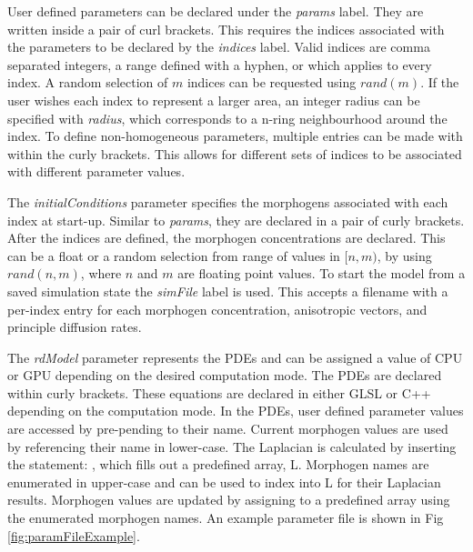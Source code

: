 User defined parameters can be declared under the \textit{params} label. They are written inside a pair of curl brackets. This requires the indices associated with the parameters to be declared by the \textit{indices} label. Valid indices are comma separated integers, a range defined with a hyphen, or  which applies to every index. A random selection of $m$ indices can be requested using $rand(m)$. If the user wishes each index to represent a larger area, an integer radius can be specified with \textit{radius}, which corresponds to a n-ring neighbourhood around the index. To define non-homogeneous parameters, multiple entries can be made with within the curly brackets. This allows for different sets of indices to be associated with different parameter values.

The \textit{initialConditions} parameter specifies the morphogens associated with each index at start-up. Similar to \textit{params}, they are declared in a pair of curly brackets. After the indices are defined, the morphogen concentrations are declared. This can be a float or a random selection from range of values in $[n, m)$, by using $rand(n, m)$, where $n$ and $m$ are floating point values. To start the model from a saved simulation state the \textit{simFile} label is used. This accepts a filename with a per-index entry for each morphogen concentration, anisotropic vectors, and principle diffusion rates.

The \textit{rdModel} parameter represents the PDEs and can be assigned a value of CPU or GPU depending on the desired computation mode. The PDEs are declared within curly brackets. These equations are declared in either GLSL or C++ depending on the computation mode. In the PDEs, user defined parameter values are accessed by pre-pending  to their name. Current morphogen values are used by referencing their name in lower-case. The Laplacian is calculated by inserting the statement: , which fills out a predefined array, L. Morphogen names are enumerated in upper-case and can be used to index into L for their Laplacian results. Morphogen values are updated by assigning to a predefined  array using the enumerated morphogen names. An example parameter file is shown in Fig \ref{fig:paramFileExample}.


